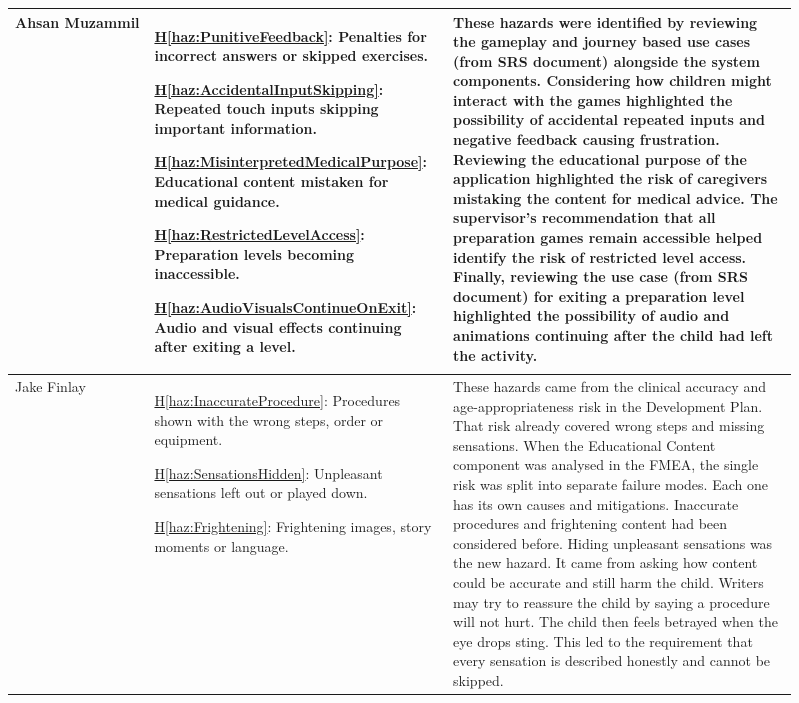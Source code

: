 \documentclass{article}
\newcounter{hazard}
\newcommand{\hazref}[1]{\hyperref[haz:#1]{H\ref*{haz:#1}}}
\begin{document}
\begin{enumerate}
\begin{longtable}{@{}
        p{0.17\linewidth}
        p{0.32\linewidth}
        p{0.42\linewidth}
    @{}}
    Ahsan Muzammil &
    \hazref{PunitiveFeedback}: Penalties for incorrect
    answers or skipped exercises.

    \hazref{AccidentalInputSkipping}: Repeated touch
    inputs skipping important information.

    \hazref{MisinterpretedMedicalPurpose}: Educational
    content mistaken for medical guidance.

    \hazref{RestrictedLevelAccess}: Preparation levels
    becoming inaccessible.

    \hazref{AudioVisualsContinueOnExit}: Audio and
    visual effects continuing after exiting a level.
    &
    These hazards were identified by reviewing the
    gameplay and journey based use cases (from SRS document) alongside
    the system components. Considering how children
    might interact with the games highlighted the
    possibility of accidental repeated inputs and
    negative feedback causing frustration.
    Reviewing the educational purpose of the
    application highlighted the risk of caregivers
    mistaking the content for medical advice.
    The supervisor's recommendation that all
    preparation games remain accessible helped
    identify the risk of restricted level access.
    Finally, reviewing the use case (from SRS document) for exiting
    a preparation level highlighted the possibility
    of audio and animations continuing after the
    child had left the activity. \\
    \midrule

    Jake Finlay &
    \hazref{InaccurateProcedure}: Procedures shown
    with the wrong steps, order or equipment.

    \hazref{SensationsHidden}: Unpleasant sensations
    left out or played down.

    \hazref{Frightening}: Frightening images, story
    moments or language.
    &
    These hazards came from the clinical accuracy and
    age-appropriateness risk in the Development Plan.
    That risk already covered wrong steps and missing
    sensations. When the Educational Content component
    was analysed in the FMEA, the single risk was split
    into separate failure modes. Each one has its own
    causes and mitigations. Inaccurate procedures and
    frightening content had been considered before.
    Hiding unpleasant sensations was the new hazard.
    It came from asking how content could be accurate
    and still harm the child. Writers may try to
    reassure the child by saying a procedure will not
    hurt. The child then feels betrayed when the eye
    drops sting. This led to the requirement that every
    sensation is described honestly and cannot be
    skipped. \\
    \midrule


\end{longtable}
\end{enumerate}
\end{document}

